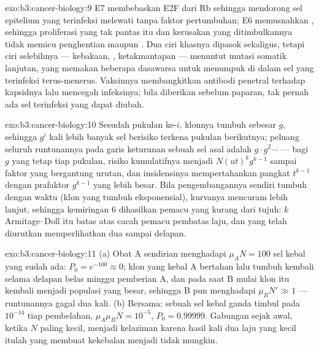 \begin{solution}{exo:b3:cancer-biology:9}
E7 membebaskan E2F dari Rb sehingga mendorong sel epitelium yang terinfeksi
melewati  tanpa faktor pertumbuhan; E6 memusnahkan , sehingga
proliferasi yang tak pantas itu dan kerusakan yang ditimbulkannya tidak memicu
penghentian maupun . Dua ciri khasnya dipasok sekaligus, tetapi ciri
selebihnya --- kebakaan, , ketakmantapan --- menuntut mutasi somatik
lanjutan, yang memakan beberapa dasawarsa untuk menumpuk di dalam sel yang
terinfeksi terus-menerus. Vaksinnya membangkitkan antibodi penetral terhadap
kapsidnya lalu mencegah infeksinya; bila diberikan sebelum paparan, tak pernah
ada sel terinfeksi yang dapat diubah.
\end{solution}

\begin{solution}{exo:b3:cancer-biology:10}
Sesudah pukulan ke-$i$, klonnya tumbuh sebesar $g$, sehingga $g^{i}$ kali
lebih banyak sel berisiko terkena pukulan berikutnya; peluang seluruh
runtunannya pada garis keturunan sebuah sel asal adalah $g\cdot g^{2}\cdots$
--- bagi $g$ yang tetap tiap pukulan, risiko kumulatifnya menjadi $N(ut)^{k}
g^{k-1}$ sampai faktor yang bergantung urutan, dan insidensinya mempertahankan
pangkat $t^{k-1}$ dengan prafaktor $g^{k-1}$ yang lebih besar. Bila
pengembangannya sendiri tumbuh dengan waktu (klon yang tumbuh eksponensial),
kurvanya mencuram lebih lanjut, sehingga kemiringan $6$ dihasilkan pemacu yang
kurang dari tujuh: $k$ Armitage--Doll itu batas atas cacah pemacu
pembatas laju, dan  yang telah diurutkan memperlihatkan dua sampai delapan.
\end{solution}

\begin{solution}{exo:b3:cancer-biology:11}
(a) Obat A sendirian menghadapi $\mu_{A}N = 100$ sel kebal yang sudah ada:
$P_{0} = e^{-100} \approx 0$; klon yang kebal A bertahan lalu
tumbuh kembali selama delapan belas minggu pemberian A, dan pada saat B mulai
klon itu kembali menjadi populasi yang besar, sehingga B pun menghadapi
$\mu_{B}N' \gg 1$ --- runtunannya gagal dua kali. (b) Bersama: sebuah sel
kebal ganda timbul pada $10^{-14}$ tiap pembelahan, $\mu_{A}\mu_{B}N = 10^{-5}$, $P_{0} =
0.99999$. Gabungan sejak awal, ketika $N$ paling kecil, menjadi
kelaziman karena hasil kali dua laju yang kecil itulah yang membuat kekebalan
menjadi tidak mungkin.
\end{solution}

